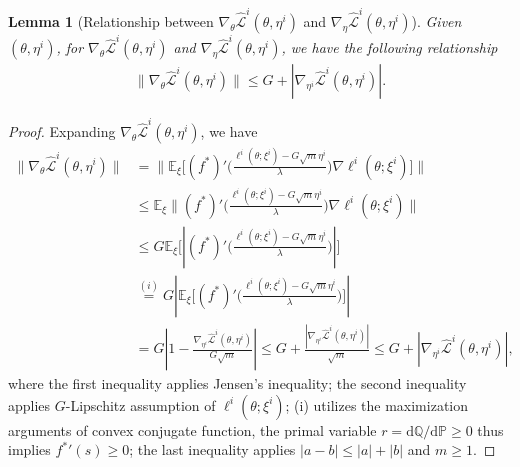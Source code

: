 \documentclass[twoside]{article} %
\theoremstyle{plain}
\newtheorem{lemma}[theorem]{Lemma}
\theoremstyle{definition}
\theoremstyle{remark}
\newcommand{\fhL}{\hat{\mathcal{L}}}
\begin{document}
\begin{lemma}[Relationship between $\nabla_{\theta}\fhL^i(\theta,\eta^i)$ and $\nabla_{\eta}\fhL^i(\theta, \eta^i)$]
    Given $(\theta,\eta^i)$, for $\nabla_{\theta}\fhL^i(\theta,\eta^i)$ and $\nabla_{\eta}\fhL^i(\theta,\eta^i)$, we have the following relationship
    \begin{align}
        \|\nabla_{\theta}\fhL^i(\theta, \eta^i)\|\leq G+|\nabla_{\eta^i}\fhL^i(\theta,\eta^i)|.
        \label{eq: gradient relationship}
    \end{align}
\end{lemma}
\begin{proof}
    Expanding $\nabla_{\theta}\fhL^i(\theta,\eta^i)$, we have
    \begin{align}
        \|\nabla_{\theta}\fhL^i(\theta, \eta^i)\|&=\|\mathbb{E}_{\xi}\Big[(f^*)'\big(\frac{\ell^i(\theta;\xi^i)-G\sqrt{m}\eta^i}{\lambda} \big)\nabla\ell^i(\theta;\xi^i)\Big]\|\nonumber\\
        &\leq \mathbb{E}_{\xi}\|(f^*)'\big(\frac{\ell^i(\theta;\xi^i)-G\sqrt{m}\eta^i}{\lambda}\big)\nabla \ell^i(\theta;\xi^i)\|\nonumber\\
        &\leq G \mathbb{E}_{\xi}\Big[ |(f^*)'\big( \frac{\ell^i(\theta;\xi^i)-G\sqrt{m}\eta^i}{\lambda}\big) |\Big]\nonumber\\
        &\overset{(i)}{=} G|\mathbb{E}_{\xi}\big[(f^*)'\big(\frac{\ell^i(\theta;\xi^i)-G\sqrt{m}\eta^i}{\lambda}\big) \big] |\nonumber\\
        &=G |1-\frac{\nabla_{\eta^i}\fhL^i(\theta,\eta^i)}{G\sqrt{m}}|\leq G+\frac{|\nabla_{\eta^i}\fhL^i(\theta,\eta^i)|}{\sqrt{m}}\leq G+|\nabla_{\eta^i}\fhL^i(\theta,\eta^i)|,
    \end{align}
where the first inequality applies Jensen's inequality; the second inequality applies $G$-Lipschitz assumption of $\ell^i(\theta;\xi^i)$; (i) utilizes the maximization arguments of convex conjugate function, the primal variable $r={\mathrm{d}\mathbb{Q}}/{\mathrm{d}\mathbb{P}}\geq 0$ thus implies ${f^*}'(s)\geq0$; the last inequality applies $|a-b|\leq |a|+|b|$ and $m\geq 1$.
\end{proof}
\end{document}
